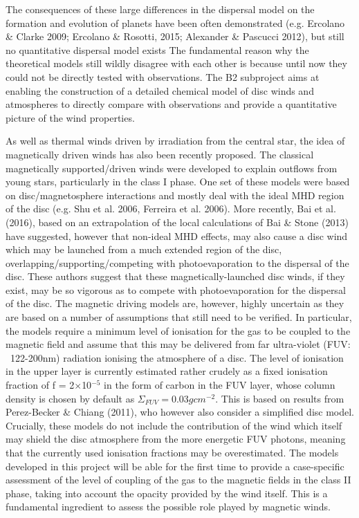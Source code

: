 \documentclass[10pt,fleqn,twoside]{article}
\begin{document}
The consequences of these large differences in the dispersal model on
the formation and evolution of planets have been often demonstrated
(e.g. Ercolano \&  Clarke 2009; Ercolano \& Rosotti, 2015; Alexander
\& Pascucci 2012), but still no quantitative dispersal model exists
The fundamental reason why the theoretical models still wildly
disagree with each other is because until now they could not be
directly tested with observations. The B2  subproject aims at enabling
the construction of a detailed chemical model of disc winds and
atmospheres to directly compare with observations and provide a
quantitative picture of the wind properties. 

As well as thermal winds driven by irradiation from the central star,
the idea of magnetically driven winds has also been recently
proposed.  The classical magnetically supported/driven winds were developed to explain outflows from young stars, particularly in the class I phase. One set of these models were based on disc/magnetosphere interactions and mostly deal with the ideal MHD region of the disc (e.g. Shu et al. 2006, Ferreira et al. 2006). 
More recently, Bai et al. (2016), based on an extrapolation of the
local calculations of Bai \& Stone (2013) have suggested, however that
non-ideal MHD effects, may also cause a disc wind which may be
launched from a much extended region of the disc,
overlapping/supporting/competing with photoevaporation to the
dispersal of the disc. These authors suggest that these magnetically-launched disc
winds, if they exist, may be so vigorous as to compete with
photoevaporation for the dispersal of the disc.
The magnetic driving models are, however, highly uncertain as they are
based on a number of assumptions that still need to be verified. In
particular, the models require a minimum level of ionisation for the
gas to be coupled to the magnetic field and assume that this may be
delivered from far ultra-violet (FUV: ~122-200nm) radiation ionising
the atmosphere of a disc. The level of ionisation in the upper layer
is currently estimated rather crudely as a fixed ionisation fraction
of f = 2$\times$10$^{−5}$ in the form of carbon in the FUV layer, whose column
density is chosen by default as $\Sigma_{FUV} = 0.03 g cm^{−2}$. This is based on
results from Perez-Becker \& Chiang (2011), who however also consider
a simplified disc model. Crucially, these models do not include the
contribution of the wind which itself may shield the disc atmosphere
from the more energetic FUV photons, meaning that the currently used
ionisation fractions may be overestimated. 
The models developed in this project will be able for the first time
to provide a case-specific assessment of the level of coupling of the
gas to the magnetic fields in the class II phase, taking into account
the opacity provided by the wind itself. This is a fundamental
ingredient to assess the possible role played by magnetic winds.  
\end{document}
